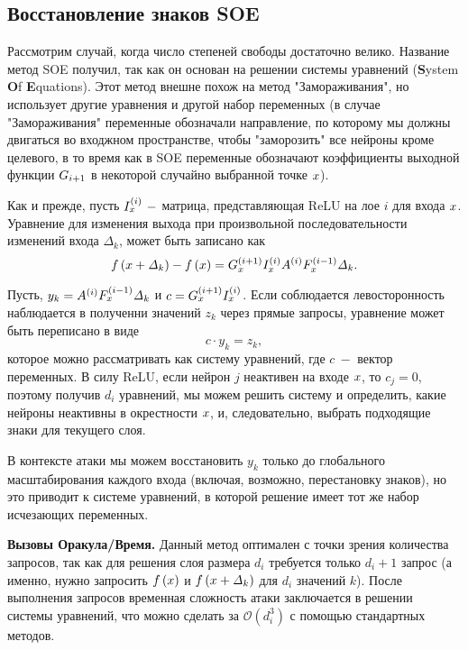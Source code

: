 \subsection{Восстановление знаков SOE}
Рассмотрим случай, когда число степеней свободы достаточно велико. Название метод SOE получил, так как он основан на решении системы уравнений (\textbf{S}ystem \textbf{O}f \textbf{E}quations). Этот метод внешне похож на метод "Замораживания", но использует другие уравнения и другой набор переменных (в случае "Замораживания" переменные обозначали направление, по которому мы должны двигаться во входжном пространстве, чтобы "заморозить" все нейроны кроме целевого, в то время как в SOE переменные обозначают коэффициенты выходной функции $\mathnormal{G}_{i+1}$ в некоторой случайно выбранной точке $\mathnormal{x}$). 

Как и прежде, пусть $I_{\mathnormal{x}}^{\left(i\right)} ~-$  матрица, представляющая ReLU на лое $i$ для входа $\mathnormal{x}$. Уравнение для изменения выхода при произвольной последовательности изменений входа $\mathit{\Delta}_{k}$, может быть записано как
$$\mathnormal{f}\left(\mathnormal{x} + \mathit{\Delta}_{k}\right) - \mathnormal{f}\left(\mathnormal{x}\right) = \mathnormal{G}_{\mathnormal{x}}^{\left(i+1\right)} {I}_{\mathnormal{x}}^{\left(i\right)} A^{\left(i\right)} \mathnormal{F}_{\mathnormal{x}}^{\left(i-1\right)} \mathit{\Delta}_{k}.$$

Пусть, $y_{k} = A^{\left(i\right)} \mathnormal{F}_{\mathnormal{x}}^{\left(i-1\right)} \mathit{\Delta}_{k}$ и $c =  \mathnormal{G}_{\mathnormal{x}}^{\left(i+1\right)} {I}_{\mathnormal{x}}^{\left(i\right)}$. Если соблюдается левосторонность наблюдается в полученни значений $z_{k}$ через прямые запросы, уравнение может быть переписано в виде
$$c \cdot y_{k} = z_{k},$$
которое можно рассматривать как систему уравнений, где $c ~-$ вектор переменных. В силу ReLU, если нейрон $j$ неактивен на входе $\mathnormal{x}$, то $c_{j}=0$, поэтому получив $d_{i}$ уравнений, мы можем решить систему и определить, какие нейроны неактивны в окрестности $\mathnormal{x}$, и, следовательно, выбрать подходящие знаки для текущего слоя.
\begin{remark}
В контексте атаки мы можем восстановить $y_{k}$ только до глобального масштабирования каждого входа (включая, возможно, перестановку знаков), но это приводит к системе уравнений, в которой решение имеет тот же набор исчезающих переменных.
\end{remark}
\textbf{Вызовы Оракула/Время.} Данный метод оптимален с точки зрения количества запросов, так как для решения слоя размера $d_{i}$ требуется только $d_{i}+1$ запрос (а именно, нужно запросить $\mathnormal{f}\left(\mathnormal{x}\right)$ и $\mathnormal{f}\left(\mathnormal{x} + \mathit{\Delta}_{k}\right)$ для $d_{i}$ значений $k$). После выполнения запросов временная сложность атаки заключается в решении системы уравнений, что можно сделать за $\mathcal{O}\left(d_{i}^{3}\right)$ с помощью стандартных методов.


